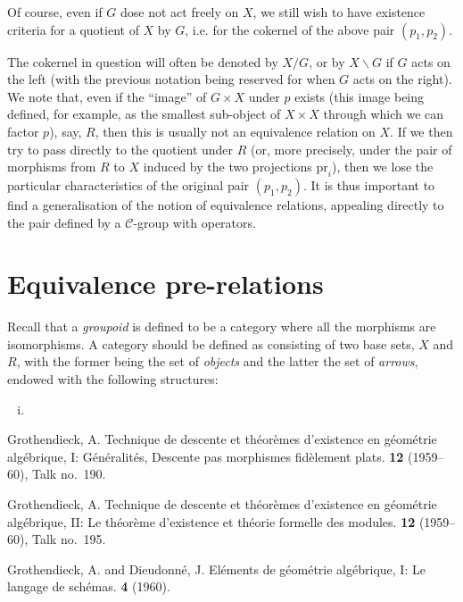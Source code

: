 \documentclass{article}
\renewcommand{\cal}[1]{{\mathcal{#1}}}
\newcommand{\pr}{\mathrm{pr}}
\newcommand{\oldpage}[1]{\marginpar{\footnotesize$\Big\vert$ \textit{p.~#1}}}
\begin{document}
Of course, even if $G$ dose not act freely on $X$, we still wish to have existence criteria for a quotient of $X$ by $G$, i.e. for the cokernel of the above pair $(p_1,p_2)$.

The cokernel in question will often be denoted by $X/G$, or by $X\backslash G$ if $G$ acts on the left (with the previous notation being reserved for when $G$ acts on the right).
We note that, even if the ``image'' of $G\times X$ under $p$ exists (this image being defined, for example, as the smallest sub-object of $X\times X$ through which we can factor $p$), say, $R$, then this is usually not an equivalence relation on $X$.
If we then try to pass directly to the quotient under $R$ (or, more precisely, under the pair of morphisms from $R$ to $X$ induced by the two projections $\pr_i$), then we lose the particular characteristics of the original pair $(p_1,p_2)$.
It is thus important to find a generalisation of the notion of equivalence relations, appealing directly to the pair defined by a $\cal{C}$-group with operators.


\section{Equivalence pre-relations}
\label{4}

Recall that a \emph{groupoid} is defined to be a category where all the morphisms are isomorphisms.
A category should be defined as consisting of two base sets, $X$ and $R$, with the former being the set of \emph{objects} and the latter the set of \emph{arrows}, endowed with the following structures:
\oldpage{212-08}
\begin{enumerate}[(i)]
  \item 
\end{enumerate}






\nocite{*}
\begin{thebibliography}{3}

  {\sc Grothendieck, A.}
  \newblock Technique de descente et th\'{e}or\`{e}mes d'existence en g\'{e}om\'{e}trie alg\'{e}brique, I: G\'{e}n\'{e}ralit\'{e}s, Descente pas morphismes fid\`{e}lement plats.
   \textbf{12} (1959--60), Talk no.~190.

  {\sc Grothendieck, A.}
  \newblock Technique de descente et th\'{e}or\`{e}mes d'existence en g\'{e}om\'{e}trie alg\'{e}brique, II: Le th\'{e}or\`{e}me d'existence et th\'{e}orie formelle des modules.
   \textbf{12} (1959--60), Talk no.~195.

  {\sc Grothendieck, A. and Dieudonn\'{e}, J.}
  \newblock El\'{e}ments de g\'{e}om\'{e}trie alg\'{e}brique, I: Le langage de sch\'{e}mas.
   \textbf{4} (1960).

\end{thebibliography}
\end{document}
